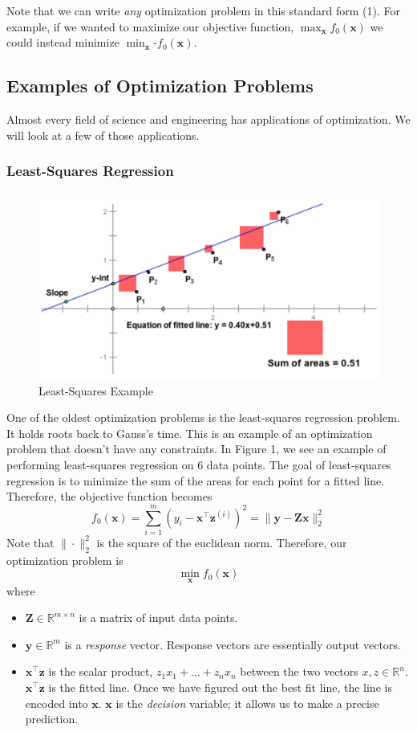 \documentclass[12pt]{article}
\begin{document}
\noindent Note that we can write \textit{any} optimization problem in this standard form (1). For example, if we wanted to maximize our objective function, $\max_\mathbf{x} f_0(\mathbf{x})$ we could instead minimize $\min_\mathbf{x}{\text{-} f_0(\mathbf{x})}$. 


\subsection{Examples of Optimization Problems}
Almost every field of science and engineering has applications of optimization. We will look at a few of those applications.
\subsubsection{Least-Squares Regression}
\begin{figure}[h!]\begin{center}\includegraphics[scale=0.2]{figures/leastsquares}\caption{Least-Squares Example}\end{center}\end{figure}
\noindent One of the oldest optimization problems is the least-squares regression problem. It holds roots back to Gauss's time. This is an example of an optimization problem that doesn't have any constraints. In Figure 1, we see an example of performing least-squares regression on $6$ data points. The goal of least-squares regression is to minimize the sum of the areas for each point for a fitted line. 
\noindent Therefore, the objective function becomes $$f_0(\mathbf{x}) = \sum_{i=1}^m \left(y_i-\mathbf{x}^\top \mathbf{z}^{(i)}\right)^2 = \|\mathbf{y} - \mathbf{Z}\mathbf{x}\|_2^2$$
Note that $\|\cdot\|_2^2$ is the square of the euclidean norm. 
Therefore, our optimization problem is
$$\min_\mathbf{x}f_0(\mathbf{x})$$ 
where
\begin{itemize}
\item $\mathbf{Z}\in\mathbb{R}^{m\times n}$ is a matrix of input data points. 
\item $\mathbf{y}\in\mathbb{R}^m$ is a \textit{response} vector. Response vectors are essentially output vectors.
\item $\mathbf{x}^\top \mathbf{z}$ is the scalar product, $z_1x_1 + \ldots + z_nx_n$ between the two vectors $x,z\in\mathbb{R}^n$. $\mathbf{x}^\top \mathbf{z}$ is the fitted line. Once we have figured out the best fit line, the line is encoded into $\mathbf{x}$. $\mathbf{x}$ is the \textit{decision} variable; it allows us to make a precise prediction. 
\end{itemize}
\end{document}
